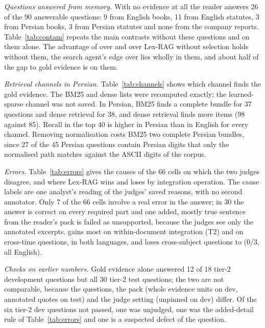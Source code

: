 

\emph{Questions answered from memory.} With no evidence at all the reader answers 26 of the 90 answerable questions: 9 from English books, 11 from English statutes, 3 from Persian books, 3 from Persian statutes and none from the company reports. Table~\ref{tab:contam} repeats the main contrasts without these questions and on them alone. The advantage of \lexb{} over \hybrid{} and over Lex-RAG without selection holds without them, the search agent's edge over \hr{} lies wholly in them, and about half of the gap to gold evidence is on them.



\emph{Retrieval channels in Persian.} Table~\ref{tab:channels} shows which channel finds the gold evidence. The BM25 and dense lists were recomputed exactly; the learned-sparse channel was not saved. In Persian, BM25 finds a complete bundle for 37 questions and dense retrieval for 38, and dense retrieval finds more items (98 against 85). Recall in the top 40 is higher in Persian than in English for every channel. Removing normalisation costs BM25 two complete Persian bundles, since 27 of the 45 Persian questions contain Persian digits that only the normalised path matches against the ASCII digits of the corpus.



\emph{Errors.} Table~\ref{tab:errors} gives the causes of the 66 cells on which the two judges disagree, and where Lex-RAG wins and loses by integration operation. The cause labels are one analyst's reading of the judges' saved reasons, with no second annotator. Only 7 of the 66 cells involve a real error in the answer; in 30 the answer is correct on every required part and one added, mostly true sentence from the reader's pack is failed as unsupported, because the judges see only the annotated excerpts. \lexb{} gains most on within-document integration (T2) and on cross-time questions, in both languages, and loses cross-subject questions to \hr{} (0/3, all English).



\emph{Checks on earlier numbers.} Gold evidence alone answered 12 of 18 tier-2 development questions but all 30 tier-2 test questions; the two are not comparable, because the questions, the pack (whole evidence units on dev, annotated quotes on test) and the judge setting (unpinned on dev) differ. Of the six tier-2 dev questions not passed, one was unjudged, one was the added-detail rule of Table~\ref{tab:errors} and one is a suspected defect of the question.

